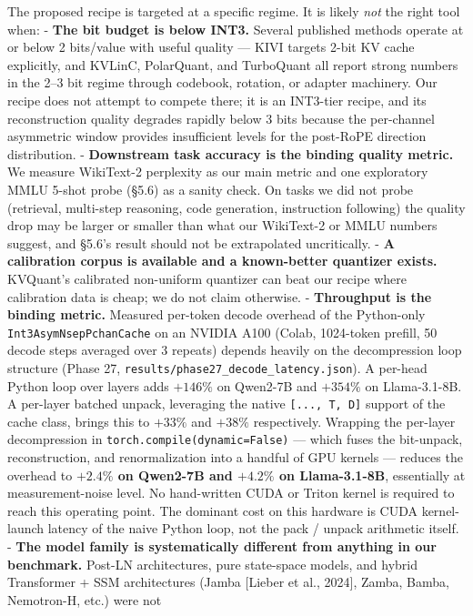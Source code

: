 The proposed recipe is targeted at a specific regime. It is likely
\emph{not} the right tool when: - \textbf{The bit budget is below INT3.}
Several published methods operate at or below 2 bits/value with useful
quality --- KIVI targets 2-bit KV cache explicitly, and KVLinC,
PolarQuant, and TurboQuant all report strong numbers in the 2--3 bit
regime through codebook, rotation, or adapter machinery. Our recipe does
not attempt to compete there; it is an INT3-tier recipe, and its
reconstruction quality degrades rapidly below 3 bits because the
per-channel asymmetric window provides insufficient levels for the
post-RoPE direction distribution. - \textbf{Downstream task accuracy is
the binding quality metric.} We measure WikiText-2 perplexity as our
main metric and one exploratory MMLU 5-shot probe (§5.6) as a sanity
check. On tasks we did not probe (retrieval, multi-step reasoning, code
generation, instruction following) the quality drop may be larger or
smaller than what our WikiText-2 or MMLU numbers suggest, and §5.6's
result should not be extrapolated uncritically. - \textbf{A calibration
corpus is available and a known-better quantizer exists.} KVQuant's
calibrated non-uniform quantizer can beat our recipe where calibration
data is cheap; we do not claim otherwise. - \textbf{Throughput is the
binding metric.} Measured per-token decode overhead of the Python-only
\texttt{Int3AsymNsepPchanCache} on an NVIDIA A100 (Colab, 1024-token
prefill, 50 decode steps averaged over 3 repeats) depends heavily on the
decompression loop structure (Phase 27,
\texttt{results/phase27\_decode\_latency.json}). A per-head Python loop
over layers adds \(+146 \%\) on Qwen2-7B and \(+354 \%\) on
Llama-3.1-8B. A per-layer batched unpack, leveraging the native
\texttt{{[}...,\ T,\ D{]}} support of the cache class, brings this to
\(+33 \%\) and \(+38 \%\) respectively. Wrapping the per-layer
decompression in \texttt{torch.compile(dynamic=False)} --- which fuses
the bit-unpack, reconstruction, and renormalization into a handful of
GPU kernels --- reduces the overhead to \textbf{\(+2.4 \%\) on Qwen2-7B
and \(+4.2 \%\) on Llama-3.1-8B}, essentially at measurement-noise
level. No hand-written CUDA or Triton kernel is required to reach this
operating point. The dominant cost on this hardware is CUDA
kernel-launch latency of the naive Python loop, not the pack / unpack
arithmetic itself. - \textbf{The model family is systematically
different from anything in our benchmark.} Post-LN architectures, pure
state-space models, and hybrid Transformer + SSM architectures (Jamba
{[}Lieber et al., 2024{]}, Zamba, Bamba, Nemotron-H, etc.) were not

